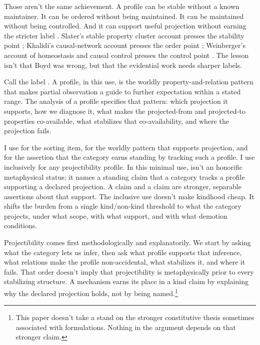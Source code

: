 \documentclass[12pt]{article}
\begin{document}
Those aren't the same achievement. A profile can be stable without a known
maintainer. It can be ordered without being maintained. It can be maintained
without being controlled. And it can support useful projection without earning
the stricter label . Slater's stable property cluster account
presses the stability point \citep{slater2015}; Khalidi's causal-network account
presses the order point \citep{khalidi2013,khalidi2018nodes}; Weinberger's
account of homeostasis and causal control presses the control point
\citep{weinberger2026HomeostasisCausalControlBP}. The lesson isn't that Boyd
was wrong, but that the evidential work needs sharper labels.

Call the label . A profile, in this use, is the
worldly property-and-relation pattern that makes partial observation a guide to
further expectation within a stated range. The analysis of a profile specifies
that pattern: which projection it supports, how we diagnose it, what makes the
projected-from and projected-to properties co-available, what stabilizes that
co-availability, and where the projection fails.

I use  for the sorting item,  for the worldly
pattern that supports projection, and  for the assertion that
the category earns standing by tracking such a profile. I use
 inclusively for any projectibility profile. In this minimal use,
 isn't an honorific metaphysical status; it names a standing claim
that a category tracks a profile supporting a declared projection. A
 claim and a  claim are stronger, separable
assertions about that support. The inclusive use doesn't make kindhood cheap. It
shifts the burden from a single kind/non-kind threshold to what the category
projects, under what scope, with what support, and with what demotion
conditions.

Projectibility comes first methodologically and explanatorily. We start by
asking what the category lets us infer, then ask what profile supports that
inference, what relations make the profile non-accidental, what stabilizes it,
and where it fails. That order doesn't imply that projectibility is
metaphysically prior to every stabilizing structure. A mechanism earns its place
in a kind claim by explaining why the declared projection holds, not by being
named.\footnote{This paper doesn't take a stand on the stronger constitutive
thesis sometimes associated with  formulations.
Nothing in the argument depends on that stronger claim.}
\end{document}
